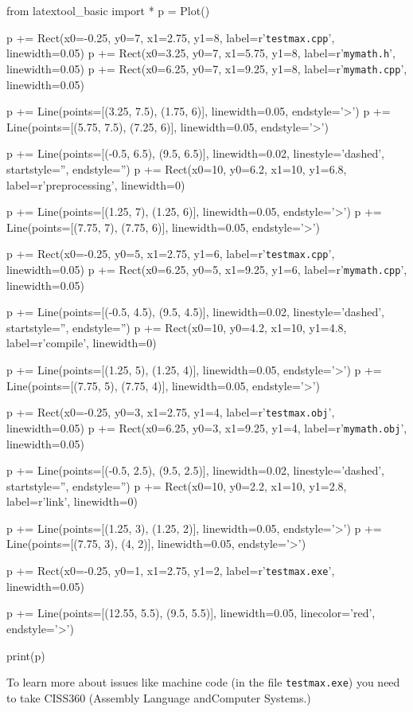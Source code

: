\begin{python}
from latextool_basic import *
p = Plot()

p += Rect(x0=-0.25, y0=7, x1=2.75, y1=8, label=r'{\tt testmax.cpp}', linewidth=0.05)
p += Rect(x0=3.25, y0=7, x1=5.75, y1=8, label=r'{\tt mymath.h}', linewidth=0.05)
p += Rect(x0=6.25, y0=7, x1=9.25, y1=8, label=r'{\tt mymath.cpp}', linewidth=0.05)

p += Line(points=[(3.25, 7.5), (1.75, 6)], linewidth=0.05, endstyle='>')
p += Line(points=[(5.75, 7.5), (7.25, 6)], linewidth=0.05, endstyle='>')

p += Line(points=[(-0.5, 6.5), (9.5, 6.5)], linewidth=0.02, linestyle='dashed', startstyle='', endstyle='')
p += Rect(x0=10, y0=6.2, x1=10, y1=6.8, label=r'{\tiny preprocessing}', linewidth=0)

p += Line(points=[(1.25, 7), (1.25, 6)], linewidth=0.05, endstyle='>')
p += Line(points=[(7.75, 7), (7.75, 6)], linewidth=0.05, endstyle='>')

p += Rect(x0=-0.25, y0=5, x1=2.75, y1=6, label=r'{\tt testmax.cpp}', linewidth=0.05)
p += Rect(x0=6.25, y0=5, x1=9.25, y1=6, label=r'{\tt mymath.cpp}', linewidth=0.05)

p += Line(points=[(-0.5, 4.5), (9.5, 4.5)], linewidth=0.02, linestyle='dashed', startstyle='', endstyle='')
p += Rect(x0=10, y0=4.2, x1=10, y1=4.8, label=r'{\tiny compile}', linewidth=0)

p += Line(points=[(1.25, 5), (1.25, 4)], linewidth=0.05, endstyle='>')
p += Line(points=[(7.75, 5), (7.75, 4)], linewidth=0.05, endstyle='>')

p += Rect(x0=-0.25, y0=3, x1=2.75, y1=4, label=r'{\tt testmax.obj}', linewidth=0.05)
p += Rect(x0=6.25, y0=3, x1=9.25, y1=4, label=r'{\tt mymath.obj}', linewidth=0.05)

p += Line(points=[(-0.5, 2.5), (9.5, 2.5)], linewidth=0.02, linestyle='dashed', startstyle='', endstyle='')
p += Rect(x0=10, y0=2.2, x1=10, y1=2.8, label=r'{\tiny link}', linewidth=0)

p += Line(points=[(1.25, 3), (1.25, 2)], linewidth=0.05, endstyle='>')
p += Line(points=[(7.75, 3), (4, 2)], linewidth=0.05, endstyle='>')

p += Rect(x0=-0.25, y0=1, x1=2.75, y1=2, label=r'{\tt testmax.exe}', linewidth=0.05)

p += Line(points=[(12.55, 5.5), (9.5, 5.5)], linewidth=0.05, linecolor='red', endstyle='>')

print(p)
\end{python}
To learn more about issues like machine code (in the file \texttt{testmax.exe}) you need to take CISS360 (Assembly Language andComputer Systems.)

